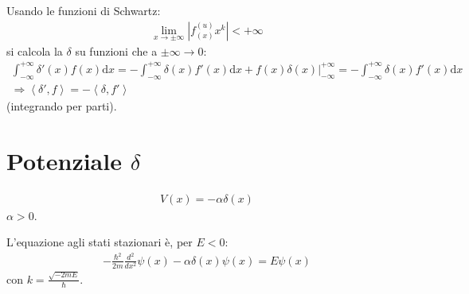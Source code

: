 Usando le funzioni di Schwartz:
\begin{equation}\begin{split}
\lim_{x\to \pm \infty }{\left |f^{\left(u\right)}_{\left(x\right)}x^k\right |}<+\infty 
\end{split}\end{equation}
si calcola la $\delta$ su funzioni che a $\pm \infty \to 0$:
\begin{equation}\begin{split}
\int_{-\infty }^{+\infty }{\delta '\left(x\right) f\left(x\right)\textrm{d}x}=-\int_{-\infty }^{+\infty }{\delta \left(x\right) f'\left(x\right)\textrm{d}x} + f\left(x\right)\delta\left(x\right)|^{+\infty }_{-\infty }=-\int_{-\infty }^{+\infty }{\delta \left(x\right) f'\left(x\right)\textrm{d}x}\\
\Longrightarrow \left\langle \delta ',f \right\rangle=-\left\langle \delta,f' \right\rangle
\end{split}\end{equation}
(integrando per parti).

\section{Potenziale $\delta$} %
\begin{equation}\begin{split}
V\left(x\right)=-\alpha \delta \left(x\right)
\end{split}\end{equation}
$\alpha >0$.

L'equazione agli stati stazionari è, per $E<0$:
\begin{equation}\begin{split}
-\frac{\hbar ^2}{2m}\frac{d^2}{dx^2}\psi \left(x\right)-\alpha \delta\left(x\right)\psi \left(x\right)=E\psi \left(x\right)
\end{split}\end{equation}
con $k=\frac{\sqrt{-2mE}}{\hbar }$.

